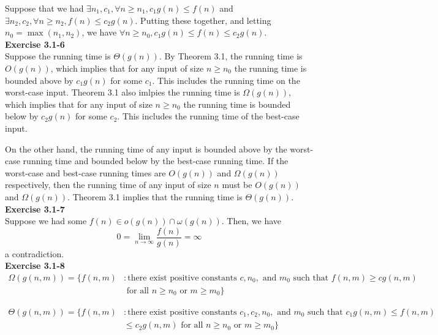 \documentclass{article}
\begin{document}
Suppose that we had $\exists n_1, c_1, \forall n\ge n_1, c_1 g(n) \le f(n)$ and $\exists n_2,c_2, \forall n\ge n_2, f(n)\le c_2g(n)$. Putting these together, and letting $n_0 = \max(n_1,n_2)$, we have $\forall n\ge n_0, c_1 g(n) \le f(n) \le c_2 g(n)$. \\

\noindent\textbf{Exercise 3.1-6}\\

Suppose the running time is $\Theta(g(n))$.  By Theorem 3.1, the running time is $O(g(n))$, which implies that for any input of size $n \geq n_0$ the running time is bounded above by $c_1g(n)$ for some $c_1$. This includes the running time on the worst-case input.  Theorem 3.1 also imlpies the running time is $\Omega(g(n))$, which implies that for any input of size $n \geq n_0$ the running time is bounded below by $c_2g(n)$ for some $c_2$.  This includes the running time of the best-case input.  

On the other hand, the running time of any input is bounded above by the worst-case running time and bounded below by the best-case running time.  If the worst-case and best-case running times are $O(g(n))$ and $\Omega(g(n))$ respectively, then the running time of any input of size $n$ must be $O(g(n))$ and $\Omega(g(n))$.  Theorem 3.1 implies that the running time is $\Theta(g(n))$. \\

\noindent\textbf{Exercise 3.1-7}\\

Suppose we had some $f(n) \in o(g(n)) \cap \omega(g(n))$. Then, we have
\[
0 = \lim_{n\rightarrow \infty} \frac{f(n)}{g(n)} = \infty
\]
a contradiction.\\

\noindent\textbf{Exercise 3.1-8}\\

\begin{align*}
 \Omega(g(n,m)) = \{ f(n,m) &: \mbox{there exist positive constants } c, n_0, \mbox{ and }m_0 \mbox{ such that } f(n,m) \geq cg(n,m) \\
&\mbox{ for all } n \geq n_0 \mbox{ or } m \geq m_0 \}
\end{align*}

\begin{align*}
\Theta(g(n,m)) = \{ f(n,m) &: \mbox{there exist positive constants } c_1, c_2, n_0, \mbox{ and }m_0 \mbox{ such that } c_1g(n,m) \leq f(n,m) \\
&\leq c_2g(n,m) \mbox{ for all } n \geq n_0 \mbox{ or } m \geq m_0 \}
\end{align*}
\end{document}
